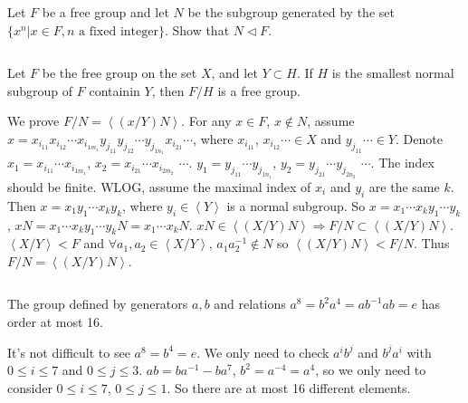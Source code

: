 $$ $$

\begin{ex}
    Let $F$ be a free group and let $N$ be the subgroup generated by the set $\{x^{n}|x\in F, n\text{ a fixed integer}\}$. Show that $N\lhd F$.
\end{ex}

$$ $$

\begin{ex}
    Let $F$ be the free group on the set $X$, and let $Y\subset H$. If $H$ is the smallest normal subgroup of $F$ containin $Y$, then $F /H$ is a free group.
\end{ex}

\begin{answer}
    We prove $F /N=\left\langle (x /Y)N\right\rangle$. For any $x\in F$, $x\notin N$, assume $x=x_{i_{11}}x_{i_{12}}\cdots x_{i_{1m_{1}}}y_{j_{11}}y_{j_{12}}\cdots y_{j_{1n_{1}}}x_{i_{21}}\cdots$, where $x_{i_{11}}$, $x_{i_{12}}\cdots\in X$ and $y_{j_{11}}\cdots\in Y$. Denote $x_{1}=x_{i_{11}}\cdots x_{i_{1m_{1}}}$, $x_{2}=x_{i_{21}}\cdots x_{i_{2m_{2}}}$ $\cdots$. $y_{1}=y_{j_{11}}\cdots y_{j_{1n_{1}}}$,  $y_{2}=y_{j_{21}}\cdots y_{j_{2n_{2}}}$ $\cdots$. The index should be finite. WLOG, assume the maximal index of $x_{i}$ and $y_{i}$ are the same $k$. Then $x=x_{1}y_{1}\cdots x_{k}y_{k}$, where $y_{i}\in \left\langle Y\right\rangle$ is a normal subgroup. So $x=x_{1}\cdots x_{k}y_{1}\cdots y_{k}$, $xN=x_{1}\cdots x_{k}y_{1}\cdots y_{k}N=x_{1}\cdots x_{k}N$. $xN\in \left\langle (X/Y)N\right\rangle\Rightarrow F /N\subset \left\langle (X /Y)N\right\rangle$. $\left\langle X /Y\right\rangle < F$ and $\forall a_{1},a_{2}\in \left\langle X /Y\right\rangle$, $a_{1}a_{2}^{-1}\notin N$ so $\left\langle(X /Y)N\right\rangle< F /N$. Thus $F /N=\left\langle (X /Y)N\right\rangle$.
\end{answer}

$$ $$

\begin{ex}
    The group defined by generators $a,b$ and relations $a^{8}=b^{2}a^{4}=ab^{-1}ab=e$ has order at most 16.
\end{ex}

\begin{answer}
    It's not difficult to see $a^{8}=b^{4}=e$. We only need to check $a^{i}b^{j}$ and $b^{j}a^{i}$ with $0\leq i\leq 7$ and $0\leq j\leq 3$. $ab=ba^{-1}-ba^{7}$, $b^{2}=a^{-4}=a^{4}$, so we only need to consider $0\leq i\leq 7$, $0\leq j\leq 1$. So there are at most 16 different elements.
\end{answer}

